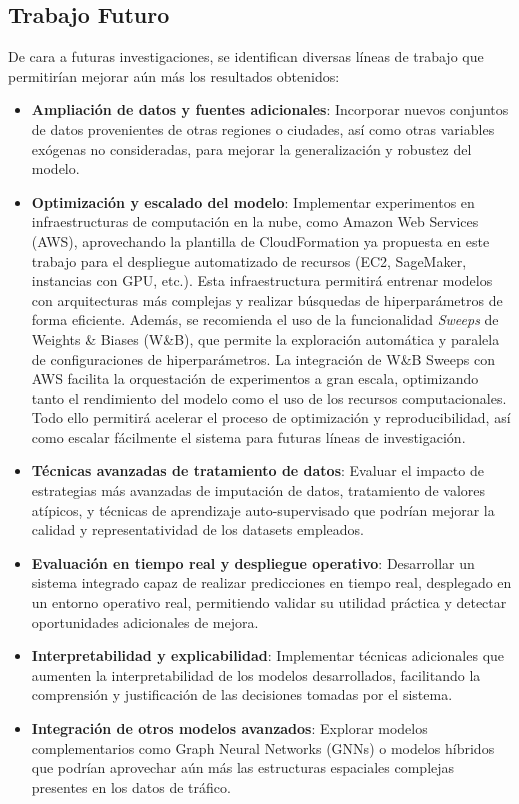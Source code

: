 \subsection{Trabajo Futuro}
\label{sec:trabajo_futuro}

De cara a futuras investigaciones, se identifican diversas líneas de trabajo que permitirían mejorar aún más los resultados obtenidos:

\begin{itemize}
	\item \textbf{Ampliación de datos y fuentes adicionales}: Incorporar nuevos conjuntos de datos provenientes de otras regiones o ciudades, así como otras variables exógenas no consideradas, para mejorar la generalización y robustez del modelo.
	\item \textbf{Optimización y escalado del modelo}: Implementar experimentos en infraestructuras de computación en la nube, como Amazon Web Services (AWS), aprovechando la plantilla de CloudFormation ya propuesta en este trabajo para el despliegue automatizado de recursos (EC2, SageMaker, instancias con GPU, etc.). Esta infraestructura permitirá entrenar modelos con arquitecturas más complejas y realizar búsquedas de hiperparámetros de forma eficiente. 
	Además, se recomienda el uso de la funcionalidad \textit{Sweeps} de Weights \& Biases (W\&B), que permite la exploración automática y paralela de configuraciones de hiperparámetros. La integración de W\&B Sweeps con AWS facilita la orquestación de experimentos a gran escala, optimizando tanto el rendimiento del modelo como el uso de los recursos computacionales. Todo ello permitirá acelerar el proceso de optimización y reproducibilidad, así como escalar fácilmente el sistema para futuras líneas de investigación.
	\item \textbf{Técnicas avanzadas de tratamiento de datos}: Evaluar el impacto de estrategias más avanzadas de imputación de datos, tratamiento de valores atípicos, y técnicas de aprendizaje auto-supervisado que podrían mejorar la calidad y representatividad de los datasets empleados.
	\item \textbf{Evaluación en tiempo real y despliegue operativo}: Desarrollar un sistema integrado capaz de realizar predicciones en tiempo real, desplegado en un entorno operativo real, permitiendo validar su utilidad práctica y detectar oportunidades adicionales de mejora.
	\item \textbf{Interpretabilidad y explicabilidad}: Implementar técnicas adicionales que aumenten la interpretabilidad de los modelos desarrollados, facilitando la comprensión y justificación de las decisiones tomadas por el sistema.
	\item \textbf{Integración de otros modelos avanzados}: Explorar modelos complementarios como Graph Neural Networks (GNNs) o modelos híbridos que podrían aprovechar aún más las estructuras espaciales complejas presentes en los datos de tráfico.
\end{itemize}

